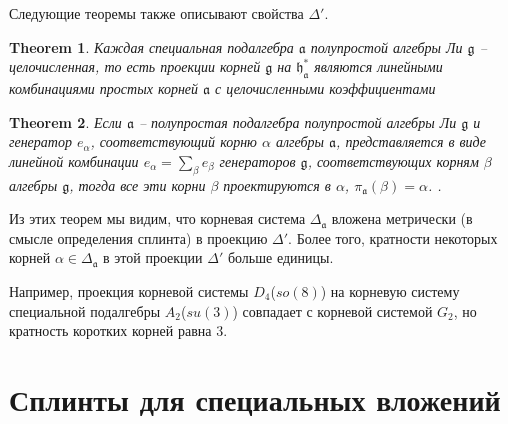 \documentclass[12pt]{article}
\newtheorem{theorem}{Theorem}
\newcommand{\pia}{\pi_{\mathfrak{a}}}
\newcommand{\gf}{\mathfrak{g}}
\newcommand{\af}{\mathfrak{a}}
\newcommand{\hf}{\mathfrak{h}}
\newcommand{\hfa}{\hf_{\af}}
\begin{document}
Следующие теоремы \cite{dynkin1952semisimpleru} также описывают свойства  $\Delta'$. 

\begin{theorem}\label{dyn1}
  Каждая специальная подалгебра  $\af$ полупростой алгебры Ли  $\gf$ -- целочисленная, то есть
  проекции корней  $\gf$ на $\hfa^{*}$ являются линейными комбинациями простых корней  $\af$ с
  целочисленными коэффициентами \cite{dynkin1952semisimpleru}
\end{theorem}

\begin{theorem}\label{dyn2}
  Если $\af$  -- полупростая подалгебра полупростой алгебры Ли $\gf$ и генератор $e_{\alpha}$,
  соответствующий корню $\alpha$ алгебры $\af$, представляется в виде линейной комбинации  $e_{\alpha}=\sum_{\beta}
  e_{\beta}$ генераторов $\gf$, соответствующих корням  $\beta$ алгебры $\gf$, тогда все эти корни
  $\beta$ проектируются в  $\alpha$,
  $\pia(\beta)=\alpha$. 
  \cite{dynkin1972semisimple,dynkin1952semisimpleru}. 
\end{theorem}

Из этих теорем мы видим, что  корневая система $\Delta_{\af}$ вложена метрически (в смысле
определения сплинта) в проекцию  $\Delta'$. Более того, кратности некоторых корней 
$\alpha\in\Delta_{\af}$ в этой проекции  $\Delta'$ больше единицы. 

Например, проекция корневой системы $D_{4}$($so(8)$) на корневую систему специальной подалгебры
$A_{2}$($su(3)$) совпадает с корневой системой $G_{2}$, но кратность коротких корней равна $3$.



\section{Сплинты для специальных вложений}
\label{sec:splints-spec-embedd}

\end{document}
